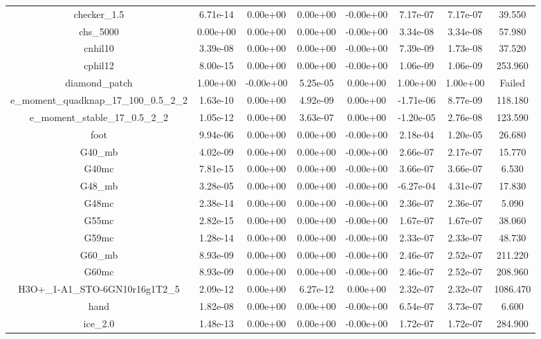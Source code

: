 {{\begin{table}[h]
\begin{center}
{\begin{tabular}{cccccccc}
         checker\_1.5 & 6.71e-14 & 0.00e+00 & 0.00e+00 & -0.00e+00 & 7.17e-07 & 7.17e-07 & 39.550 \\ 
            chs\_5000 & 0.00e+00 & 0.00e+00 & 0.00e+00 & -0.00e+00 & 3.34e-08 & 3.34e-08 & 57.980 \\ 
             cnhil10 & 3.39e-08 & 0.00e+00 & 0.00e+00 & -0.00e+00 & 7.39e-09 & 1.73e-08 & 37.520 \\ 
             cphil12 & 8.00e-15 & 0.00e+00 & 0.00e+00 & -0.00e+00 & 1.06e-09 & 1.06e-09 & 253.960 \\ 
       diamond\_patch & 1.00e+00 & -0.00e+00 & 5.25e-05 & 0.00e+00 & 1.00e+00 & 1.00e+00 & Failed \\ 
e\_moment\_quadknap\_17\_100\_0.5\_2\_2 & 1.63e-10 & 0.00e+00 & 4.92e-09 & 0.00e+00 & -1.71e-06 & 8.77e-09 & 118.180 \\ 
e\_moment\_stable\_17\_0.5\_2\_2 & 1.05e-12 & 0.00e+00 & 3.63e-07 & 0.00e+00 & -1.20e-05 & 2.76e-08 & 123.590 \\ 
                foot & 9.94e-06 & 0.00e+00 & 0.00e+00 & -0.00e+00 & 2.18e-04 & 1.20e-05 & 26.680 \\ 
              G40\_mb & 4.02e-09 & 0.00e+00 & 0.00e+00 & -0.00e+00 & 2.66e-07 & 2.17e-07 & 15.770 \\ 
               G40mc & 7.81e-15 & 0.00e+00 & 0.00e+00 & -0.00e+00 & 3.66e-07 & 3.66e-07 & 6.530 \\ 
              G48\_mb & 3.28e-05 & 0.00e+00 & 0.00e+00 & -0.00e+00 & -6.27e-04 & 4.31e-07 & 17.830 \\ 
               G48mc & 2.38e-14 & 0.00e+00 & 0.00e+00 & -0.00e+00 & 2.36e-07 & 2.36e-07 & 5.090 \\ 
               G55mc & 2.82e-15 & 0.00e+00 & 0.00e+00 & -0.00e+00 & 1.67e-07 & 1.67e-07 & 38.060 \\ 
               G59mc & 1.28e-14 & 0.00e+00 & 0.00e+00 & -0.00e+00 & 2.33e-07 & 2.33e-07 & 48.730 \\ 
              G60\_mb & 8.93e-09 & 0.00e+00 & 0.00e+00 & -0.00e+00 & 2.46e-07 & 2.52e-07 & 211.220 \\ 
               G60mc & 8.93e-09 & 0.00e+00 & 0.00e+00 & -0.00e+00 & 2.46e-07 & 2.52e-07 & 208.960 \\ 
H3O+\_1-A1\_STO-6GN10r16g1T2\_5 & 2.09e-12 & 0.00e+00 & 6.27e-12 & 0.00e+00 & 2.32e-07 & 2.32e-07 & 1086.470 \\ 
                hand & 1.82e-08 & 0.00e+00 & 0.00e+00 & -0.00e+00 & 6.54e-07 & 3.73e-07 & 6.600 \\ 
             ice\_2.0 & 1.48e-13 & 0.00e+00 & 0.00e+00 & -0.00e+00 & 1.72e-07 & 1.72e-07 & 284.900 \\ 

\end{tabular}}
\end{center}
\end{table}}}
